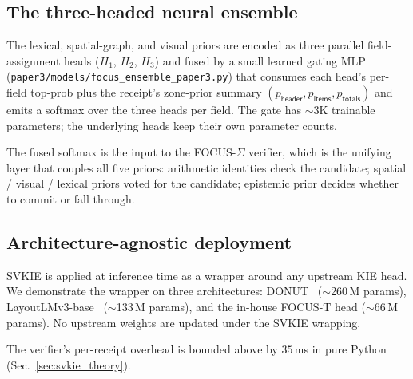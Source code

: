\subsection{The three-headed neural ensemble}

The lexical, spatial-graph, and visual priors are encoded as three
parallel field-assignment heads ($H_1$, $H_2$, $H_3$) and fused by a
small learned gating MLP
(\texttt{paper3/models/focus\_ensemble\_paper3.py}) that consumes
each head's per-field top-prob plus the receipt's zone-prior
summary $(p_{\textsf{header}}, p_{\textsf{items}}, p_{\textsf{totals}})$
and emits a softmax over the three heads per field.  The gate has
$\sim$3K trainable parameters; the underlying heads keep their own
parameter counts.

The fused softmax is the input to the FOCUS-$\Sigma$ verifier, which
is the unifying layer that couples all five priors: arithmetic
identities check the candidate; spatial / visual / lexical priors
voted for the candidate; epistemic prior decides whether to commit
or fall through.

\subsection{Architecture-agnostic deployment}

SVKIE is applied at inference time as a wrapper around any upstream
KIE head.  We demonstrate the wrapper on three architectures:
DONUT~\cite{kim2022donut} ($\sim$260\,M params),
LayoutLMv3-base~\cite{huang2022layoutlmv3} ($\sim$133\,M params),
and the in-house FOCUS-T head ($\sim$66\,M params).  No upstream
weights are updated under the SVKIE wrapping.

The verifier's per-receipt overhead is bounded above by $35$\,ms in
pure Python (Sec.~\ref{sec:svkie_theory}).
